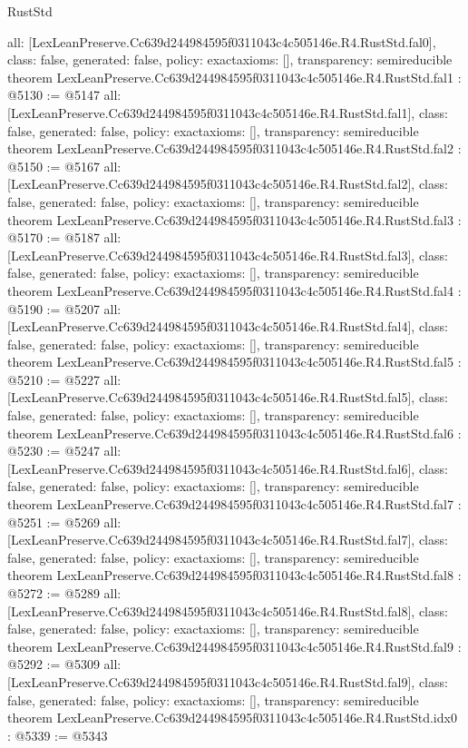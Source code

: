 \begin{lexlean}{RustStd}
\begin{coremodule}
{  all: [LexLeanPreserve.Cc639d244984595f0311043c4c505146e.R4.RustStd.fal0],
  class: false,
  generated: false,
  policy: exact{axioms: []},
  transparency: semireducible
}
theorem LexLeanPreserve.Cc639d244984595f0311043c4c505146e.R4.RustStd.fal1 : @5130 := @5147 {
  all: [LexLeanPreserve.Cc639d244984595f0311043c4c505146e.R4.RustStd.fal1],
  class: false,
  generated: false,
  policy: exact{axioms: []},
  transparency: semireducible
}
theorem LexLeanPreserve.Cc639d244984595f0311043c4c505146e.R4.RustStd.fal2 : @5150 := @5167 {
  all: [LexLeanPreserve.Cc639d244984595f0311043c4c505146e.R4.RustStd.fal2],
  class: false,
  generated: false,
  policy: exact{axioms: []},
  transparency: semireducible
}
theorem LexLeanPreserve.Cc639d244984595f0311043c4c505146e.R4.RustStd.fal3 : @5170 := @5187 {
  all: [LexLeanPreserve.Cc639d244984595f0311043c4c505146e.R4.RustStd.fal3],
  class: false,
  generated: false,
  policy: exact{axioms: []},
  transparency: semireducible
}
theorem LexLeanPreserve.Cc639d244984595f0311043c4c505146e.R4.RustStd.fal4 : @5190 := @5207 {
  all: [LexLeanPreserve.Cc639d244984595f0311043c4c505146e.R4.RustStd.fal4],
  class: false,
  generated: false,
  policy: exact{axioms: []},
  transparency: semireducible
}
theorem LexLeanPreserve.Cc639d244984595f0311043c4c505146e.R4.RustStd.fal5 : @5210 := @5227 {
  all: [LexLeanPreserve.Cc639d244984595f0311043c4c505146e.R4.RustStd.fal5],
  class: false,
  generated: false,
  policy: exact{axioms: []},
  transparency: semireducible
}
theorem LexLeanPreserve.Cc639d244984595f0311043c4c505146e.R4.RustStd.fal6 : @5230 := @5247 {
  all: [LexLeanPreserve.Cc639d244984595f0311043c4c505146e.R4.RustStd.fal6],
  class: false,
  generated: false,
  policy: exact{axioms: []},
  transparency: semireducible
}
theorem LexLeanPreserve.Cc639d244984595f0311043c4c505146e.R4.RustStd.fal7 : @5251 := @5269 {
  all: [LexLeanPreserve.Cc639d244984595f0311043c4c505146e.R4.RustStd.fal7],
  class: false,
  generated: false,
  policy: exact{axioms: []},
  transparency: semireducible
}
theorem LexLeanPreserve.Cc639d244984595f0311043c4c505146e.R4.RustStd.fal8 : @5272 := @5289 {
  all: [LexLeanPreserve.Cc639d244984595f0311043c4c505146e.R4.RustStd.fal8],
  class: false,
  generated: false,
  policy: exact{axioms: []},
  transparency: semireducible
}
theorem LexLeanPreserve.Cc639d244984595f0311043c4c505146e.R4.RustStd.fal9 : @5292 := @5309 {
  all: [LexLeanPreserve.Cc639d244984595f0311043c4c505146e.R4.RustStd.fal9],
  class: false,
  generated: false,
  policy: exact{axioms: []},
  transparency: semireducible
}
theorem LexLeanPreserve.Cc639d244984595f0311043c4c505146e.R4.RustStd.idx0 : @5339 := @5343 {
}
\end{coremodule}
\end{lexlean}
